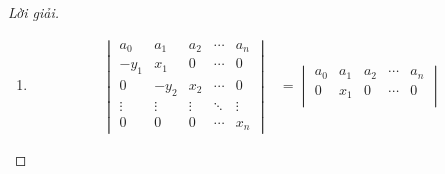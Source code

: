 \begin{proof}[Lời giải]
\begin{enumerate}[label = (\alph*)]
\begin{align*}
\begin{vmatrix}
                  \end{vmatrix} (r_{k}:= r_{k} - b_{k}r_{n})     \\
                   & =
                  (-1){}^{n-1}a_{1}b_{n}
                  \begin{vmatrix}
                      1      & a_{2}                   & a_{3}                   & \cdots & a_{n}                       \\
                      0      & a_{1}b_{2} - a_{2}b_{1} & a_{1}b_{3} - a_{3}b_{1} & \cdots & a_{1}b_{n} - a_{n}b_{1}     \\
                      0      & 0                       & a_{2}b_{3} - a_{3}b_{2} & \cdots & a_{2}b_{n} - a_{n}b_{2}     \\
                      0      & 0                       & 0                       & \cdots & a_{3}b_{n} - a_{n}b_{3}     \\
                      \vdots & \vdots                  & \vdots                  & \ddots & \vdots                      \\
                      0      & 0                       & 0                       & \cdots & a_{n-1}b_{n} - a_{n}b_{n-1}
                  \end{vmatrix} \\
                   & =
                  {(-1)}^{n-1}a_{1}b_{n}(a_{1}b_{2} - a_{2}b_{1})(a_{2}b_{3} - a_{3}b_{2})\cdots (a_{n-1}b_{n} - a_{n}b_{n-1}).
              \end{align*}
        \item
              \begin{align*}
                  \begin{vmatrix}
                      a_{0}  & a_{1}  & a_{2}  & \cdots & a_{n}  \\
                      -y_{1} & x_{1}  & 0      & \cdots & 0      \\
                      0      & -y_{2} & x_{2}  & \cdots & 0      \\
                      \vdots & \vdots & \vdots & \ddots & \vdots \\
                      0      & 0      & 0      & \cdots & x_{n}
                  \end{vmatrix}
                   & =
                  \begin{vmatrix}
                      a_{0}  & a_{1}  & a_{2}  & \cdots & a_{n}  \\
                      0      & x_{1}  & 0      & \cdots & 0      \\

\end{vmatrix}
\end{align*}
\end{enumerate}
\end{proof}

